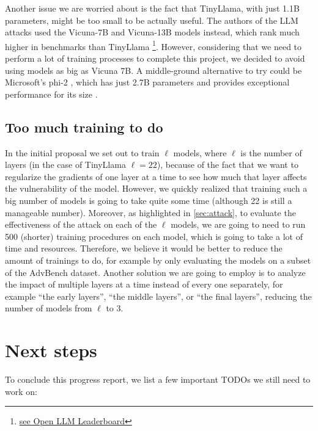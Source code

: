 \documentclass[11pt]{article}
\begin{document}
Another issue we are worried about is the fact that TinyLlama, with just 1.1B parameters, might be too small to be actually useful. The authors of the LLM attacks \cite{zou2023universal} used the Vicuna-7B and Vicuna-13B models \cite{zheng2023judgingllmasajudgemtbenchchatbot} instead, which rank much higher in benchmarks than TinyLlama \footnote{\href{https://huggingface.co/spaces/open-llm-leaderboard/open_llm_leaderboard\#/?search=tinyllama\%3Bvicuna\%3Bphi-2}{see Open LLM Leaderboard}}. However, considering that we need to perform a lot of training processes to complete this project, we decided to avoid using models as big as Vicuna 7B. A middle-ground alternative to try could be Microsoft's phi-2 \cite{javaheripi2023phi}, which has just 2.7B parameters and provides exceptional performance for its size \footnotemark[1].

\subsection{Too much training to do}

In the initial proposal we set out to train $\ell$ models, where $\ell$ is the number of layers (in the case of TinyLlama $\ell = 22$), because of the fact that we want to regularize the gradients of one layer at a time to see how much that layer affects the vulnerability of the model. However, we quickly realized that training such a big number of models is going to take quite some time (although 22 is still a manageable number). Moreover, as highlighted in \cref{sec:attack}, to evaluate the effectiveness of the attack on each of the $\ell$ models, we are going to need to run 500 (shorter) training procedures on each model, which is going to take a lot of time and resources. Therefore, we believe it would be better to reduce the amount of trainings to do, for example by only evaluating the models on a subset of the AdvBench dataset. Another solution we are going to employ is to analyze the impact of multiple layers at a time instead of every one separately, for example ``the early layers'', ``the middle layers'', or ``the final layers'', reducing the number of models from $\ell$ to $3$.

\section{Next steps}
\label{sec:todos}

To conclude this progress report, we list a few important TODOs we still need to work on:
\end{document}
